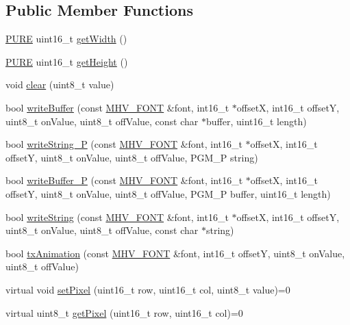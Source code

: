 \subsection*{Public Member Functions}
\begin{DoxyCompactItemize}
\item 
\hyperlink{_m_h_v__io_8h_acd42770aecb025cfac170d4d3ace4544}{P\-U\-R\-E} uint16\-\_\-t \hyperlink{class_m_h_v___display___monochrome_a9721c77df2a618b57a8e65329c9e39fa}{get\-Width} ()
\item 
\hyperlink{_m_h_v__io_8h_acd42770aecb025cfac170d4d3ace4544}{P\-U\-R\-E} uint16\-\_\-t \hyperlink{class_m_h_v___display___monochrome_a24aa901ec4ec5dbb90dc88a9ff59a70b}{get\-Height} ()
\item 
void \hyperlink{class_m_h_v___display___monochrome_aa68a62cfb715080ca3c0c3e6a306680f}{clear} (uint8\-\_\-t value)
\item 
bool \hyperlink{class_m_h_v___display___monochrome_a1f3e4d13883f4b131f25f9ab84a73ea2}{write\-Buffer} (const \hyperlink{_m_h_v___font_8h_ab7088ba808ac223275dfd526d198356f}{M\-H\-V\-\_\-\-F\-O\-N\-T} \&font, int16\-\_\-t $\ast$offset\-X, int16\-\_\-t offset\-Y, uint8\-\_\-t on\-Value, uint8\-\_\-t off\-Value, const char $\ast$buffer, uint16\-\_\-t length)
\item 
bool \hyperlink{class_m_h_v___display___monochrome_a394076c4fa10ad3a34083ef1a9376cce}{write\-String\-\_\-\-P} (const \hyperlink{_m_h_v___font_8h_ab7088ba808ac223275dfd526d198356f}{M\-H\-V\-\_\-\-F\-O\-N\-T} \&font, int16\-\_\-t $\ast$offset\-X, int16\-\_\-t offset\-Y, uint8\-\_\-t on\-Value, uint8\-\_\-t off\-Value, P\-G\-M\-\_\-\-P string)
\item 
bool \hyperlink{class_m_h_v___display___monochrome_a8f9fdf8ed1e0a4c4354dfb8ed0e70f51}{write\-Buffer\-\_\-\-P} (const \hyperlink{_m_h_v___font_8h_ab7088ba808ac223275dfd526d198356f}{M\-H\-V\-\_\-\-F\-O\-N\-T} \&font, int16\-\_\-t $\ast$offset\-X, int16\-\_\-t offset\-Y, uint8\-\_\-t on\-Value, uint8\-\_\-t off\-Value, P\-G\-M\-\_\-\-P buffer, uint16\-\_\-t length)
\item 
bool \hyperlink{class_m_h_v___display___monochrome_a08e3fb24c9f8afe4fa80744a19bc3f17}{write\-String} (const \hyperlink{_m_h_v___font_8h_ab7088ba808ac223275dfd526d198356f}{M\-H\-V\-\_\-\-F\-O\-N\-T} \&font, int16\-\_\-t $\ast$offset\-X, int16\-\_\-t offset\-Y, uint8\-\_\-t on\-Value, uint8\-\_\-t off\-Value, const char $\ast$string)
\item 
bool \hyperlink{class_m_h_v___display___monochrome_a88ac6d7ca104754a25e2f8d96a8b2be4}{tx\-Animation} (const \hyperlink{_m_h_v___font_8h_ab7088ba808ac223275dfd526d198356f}{M\-H\-V\-\_\-\-F\-O\-N\-T} \&font, int16\-\_\-t offset\-Y, uint8\-\_\-t on\-Value, uint8\-\_\-t off\-Value)
\item 
virtual void \hyperlink{class_m_h_v___display___monochrome_aa4902c62b293df9d707d89bf14c86b8a}{set\-Pixel} (uint16\-\_\-t row, uint16\-\_\-t col, uint8\-\_\-t value)=0
\item 
virtual uint8\-\_\-t \hyperlink{class_m_h_v___display___monochrome_a2da4f18d3e383fa1a9cb3091e1e5693c}{get\-Pixel} (uint16\-\_\-t row, uint16\-\_\-t col)=0
\end{DoxyCompactItemize}
